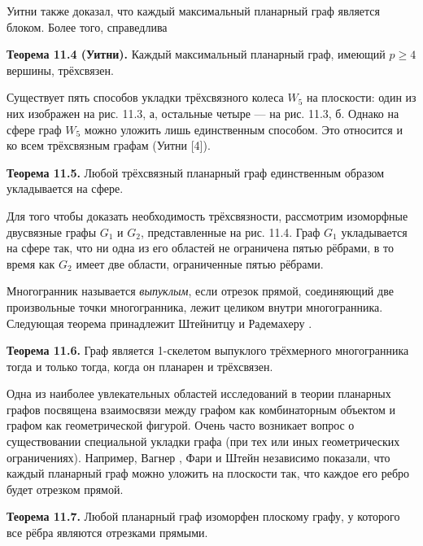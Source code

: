 Уитни также доказал, что каждый максимальный планарный граф является блоком. Более того, справедлива

\textbf{Теорема 11.4 (Уитни).} Каждый максимальный планарный граф, имеющий $p \geq 4$ вершины, трёхсвязен.

Существует пять способов укладки трёхсвязного колеса $W_5$ на плоскости: один из них изображен на рис. 11.3, а, остальные четыре — на рис. 11.3, б. Однако на сфере граф $W_5$ можно уложить лишь единственным способом. Это относится и ко всем трёхсвязным графам (Уитни [4]).


\textbf{Теорема 11.5.} Любой трёхсвязный планарный граф единственным образом укладывается на сфере.

Для того чтобы доказать необходимость трёхсвязности, рассмотрим изоморфные двусвязные графы $G_1$ и $G_2$, представленные на рис. 11.4. Граф $G_1$ укладывается на сфере так, что ни одна из его областей не ограничена пятью рёбрами, в то время как $G_2$ имеет две области, ограниченные пятью рёбрами.

Многогранник называется \textit{выпуклым}, если отрезок прямой, соединяющий две произвольные точки многогранника, лежит целиком внутри многогранника. Следующая теорема принадлежит Штейнитцу и Радемахеру \cite{1}.

\textbf{Теорема 11.6.} Граф является 1-скелетом выпуклого трёхмерного многогранника тогда и только тогда, когда он планарен и трёхсвязен.

Одна из наиболее увлекательных областей исследований в теории планарных графов посвящена взаимосвязи между графом как комбинаторным объектом и графом как геометрической фигурой. Очень часто возникает вопрос о существовании специальной укладки графа (при тех или иных геометрических ограничениях). Например, Вагнер \cite{1}, Фари \cite{1} и Штейн \cite{1} независимо показали, что каждый планарный граф можно уложить на плоскости так, что каждое его ребро будет отрезком прямой.

\textbf{Теорема 11.7.} Любой планарный граф изоморфен плоскому графу, у которого все рёбра являются отрезками прямыми.
